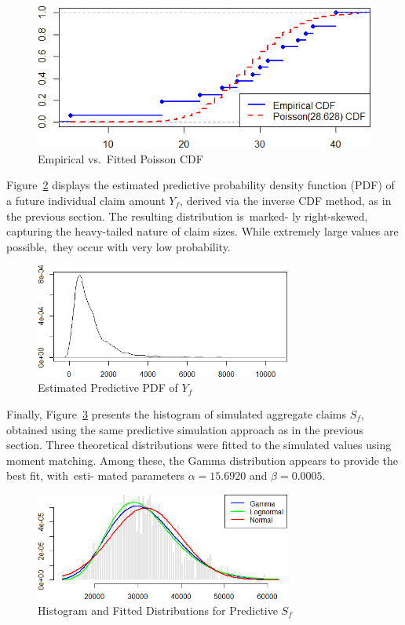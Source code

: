 \documentclass{Class/julia}
\begin{document}
\begin{figure}[!ht]
    \centering
    \caption{Empirical vs.\ Fitted Poisson CDF}
    \label{fig:17}
    \includegraphics[width=.75\textwidth]{itamtplcost/empirical_vs_poisson.png}
\end{figure}

Figure~\ref{fig:18} displays the estimated predictive probability density function (PDF) of a future individual claim amount \( Y_f \), derived via the inverse CDF method, as in the previous section. The resulting distribution is~marked- ly right-skewed, capturing the heavy-tailed nature of claim sizes. While extremely large values are possible,~they occur with very low probability.

\begin{figure}[!ht]
\centering
\caption{Estimated Predictive PDF of \( Y_f \) }
\label{fig:18}
\includegraphics[width=0.75\textwidth]{itamtplcost/predictive_Y_f.png}
\end{figure}

Finally, Figure~\ref{fig:19} presents the histogram of simulated aggregate claims \( S_f \), obtained using the same predictive simulation approach as in the previous section. Three theoretical distributions were fitted to the simulated values using moment matching. Among these, the Gamma distribution appears to provide the best fit, with~esti- mated parameters \( \alpha = 15.6920 \) and \( \beta = 0.0005 \).

\begin{figure}[!ht]
\centering
\caption{Histogram and Fitted Distributions for Predictive \( S_f \)}
\label{fig:19}
\includegraphics[width=0.75\textwidth]{itamtplcost/predictive_S_f.png}
\end{figure}
\end{document}
